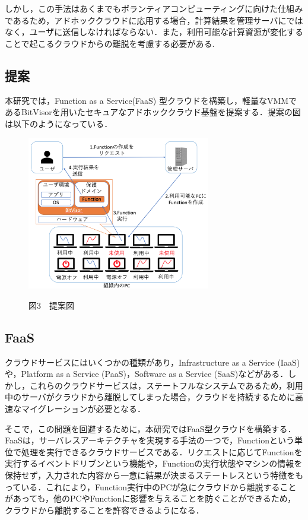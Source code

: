 \documentclass[11pt]{ujarticle} %
\begin{document}
しかし，この手法はあくまでもボランティアコンピューティングに向けた仕組みであるため，アドホッククラウドに応用する場合，計算結果を管理サーバにではなく，ユーザに送信しなければならない．また，利用可能な計算資源が変化することで起こるクラウドからの離脱を考慮する必要がある.

\subsection{提案}
本研究では，Function as a Service(FaaS) 型クラウドを構築し，軽量なVMMであるBitVisorを用いたセキュアなアドホッククラウド基盤を提案する．提案の図は以下のようになっている．

\begin{figure}[h]
  \includegraphics[width=8cm]{img/提案図.png}
\begin{center}図3　提案図\end{center}
\end{figure}

\subsection{FaaS}
クラウドサービスにはいくつかの種類があり，Infrastructure as a Service (IaaS)や，Platform as a Service (PaaS)，Software as a Service (SaaS)などがある\cite{cloud1}\cite{cloud2}．しかし，これらのクラウドサービスは，ステートフルなシステムであるため，利用中のサーバがクラウドから離脱してしまった場合，クラウドを持続するために高速なマイグレーションが必要となる．

そこで，この問題を回避するために，本研究ではFaaS型クラウドを構築する．FaaSは，サーバレスアーキテクチャを実現する手法の一つで，Functionという単位で処理を実行できるクラウドサービスである．リクエストに応じてFunctionを実行するイベントドリブンという機能や，Functionの実行状態やマシンの情報を保持せず，入力された内容から一意に結果が決まるステートレスという特徴をもっている．これにより，Function実行中のPCが急にクラウドから離脱することがあっても，他のPCやFunctionに影響を与えることを防ぐことができるため，クラウドから離脱することを許容できるようになる．
\end{document}
